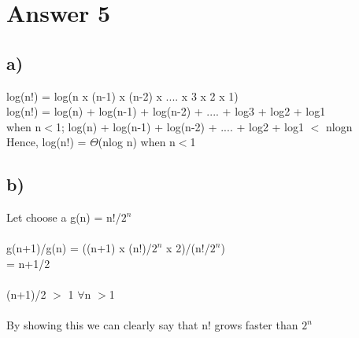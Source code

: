\documentclass[11pt]{article}
\begin{document}
\section*{Answer 5}
\subsection*{a)}
log(n!) = log(n x (n-1) x (n-2) x .... x 3 x 2 x 1)\\
log(n!) = log(n) + log(n-1) + log(n-2) + .... + log3 + log2 + log1\\
when n$<$1; log(n) + log(n-1) + log(n-2) + .... + log2 + log1 $<$ nlogn \\
Hence, log(n!) = $\Theta$(nlog n) when n$<$1

\subsection*{b)}
Let choose a g(n) = n!/$2^n$\\
\\
g(n+1)/g(n) = ((n+1) x (n!)/$2^n$ x 2)/(n!/$2^n$)\\
= n+1/2\\
\\
(n+1)/2 $>$ 1  $\forall$n $>$1\\
\\
By showing this we can clearly say that n! grows faster than $2^n$
\end{document}
